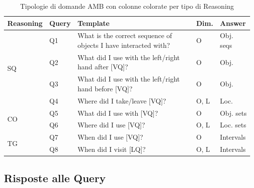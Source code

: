 \begin{table}[ht]
    \begin{center}
        \scriptsize %
        \setlength{\tabcolsep}{3pt} %
        \renewcommand{\arraystretch}{1.2} %
        \begin{tabular}{|p{1.8cm}|p{1cm}|p{7cm}|p{1cm}|p{1.5cm}|}
        \hline
        \textbf{Reasoning} & \textbf{Query} & \textbf{Template} & \textbf{Dim.} & \textbf{Answer} \\
        \hline
        \multirow{4}{*}{\textcolor[HTML]{789ECC}{SQ}} 
        & \textcolor[HTML]{789ECC}{Q1} & \raggedright What is the correct sequence of objects I have interacted with? & O & Obj. seqs \\
        \cline{2-5}
        & \textcolor[HTML]{789ECC}{Q2} & \raggedright What did I use with the left/right hand after [VQ]? & O & Obj. \\
        \cline{2-5}
        & \textcolor[HTML]{789ECC}{Q3} & \raggedright What did I use with the left/right hand before [VQ]? & O & Obj. \\
        \cline{2-5}
        & \textcolor[HTML]{789ECC}{Q4} & \raggedright Where did I take/leave [VQ]? & O, L & Loc. \\
        \hline
        \multirow{2}{*}{\textcolor[HTML]{C23A21}{CO}} 
        & \textcolor[HTML]{C23A21}{Q5} & \raggedright What did I use with [VQ]? & O & Obj. sets \\
        \cline{2-5}
        & \textcolor[HTML]{C23A21}{Q6} & \raggedright Where did I use [VQ]? & O, L & Loc. sets \\
        \hline
        \multirow{2}{*}{\textcolor[HTML]{02BF3D}{TG}} 
        & \textcolor[HTML]{02BF3D}{Q7} & \raggedright When did I use [VQ]? & O & Intervals \\
        \cline{2-5}
        & \textcolor[HTML]{02BF3D}{Q8} & \raggedright When did I visit [LQ]? & O, L & Intervals \\
        \hline
        \end{tabular}
        \caption{Tipologie di domande AMB con colonne colorate per tipo di Reasoning}
        \label{tab:amb_queries_colored}
    \end{center}
\end{table}  

\subsection*{Risposte alle Query}

